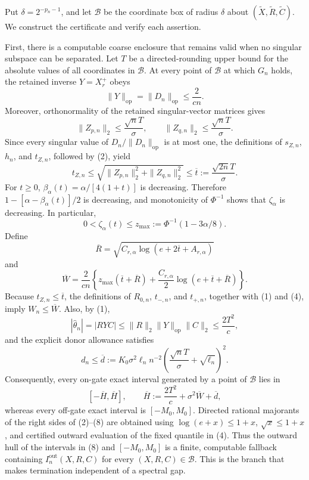 Put \(\delta=2^{-p_n-1}\), and let \(\mathcal B\) be the coordinate box of radius \(\delta\) about \((\widetilde X,\widetilde R,\widetilde C)\). We construct the certificate and verify each assertion.

First, there is a computable coarse enclosure that remains valid when no singular subspace can be separated. Let \(T\) be a directed-rounding upper bound for the absolute values of all coordinates in \(\mathcal B\). At every point of \(\mathcal B\) at which \(G_n\) holds, the retained inverse \(Y=X_r^+\) obeys
\[
\|Y\|_{\mathrm{op}}=\|D_n\|_{\mathrm{op}}\le \frac{2}{cn}.
\tag{1}
\]
Moreover, orthonormality of the retained singular-vector matrices gives
\[
\|Z_{p,n}\|_2\le \frac{\sqrt nT}{\sigma},
\qquad
\|Z_{q,n}\|_2\le \frac{\sqrt nT}{\sigma}.
\tag{2}
\]
Since every singular value of \(D_n/\|D_n\|_{\mathrm{op}}\) is at most one, the definitions of \(s_{Z,n}\), \(h_n\), and \(t_{Z,n}\), followed by (2), yield
\[
t_{Z,n}\le
\sqrt{\|Z_{p,n}\|_2^2+\|Z_{q,n}\|_2^2}
\le \overline t:=\frac{\sqrt{2n}T}{\sigma}.
\tag{3}
\]
For \(t\ge0\), \(\beta_\alpha(t)=\alpha/[4(1+t)]\) is decreasing. Therefore \(1-[\alpha-\beta_\alpha(t)]/2\) is decreasing, and monotonicity of \(\Phi^{-1}\) shows that \(\zeta_\alpha\) is decreasing. In particular,
\[
0<\zeta_\alpha(t)\le z_{\max}:=\Phi^{-1}(1-3\alpha/8).
\tag{4}
\]
Define
\[
\overline R=
\sqrt{C_{r,\alpha}\log(e+2\overline t+A_{r,\alpha})}
\]
and
\[
\overline W=\frac{2}{cn}
\left\{
z_{\max}(\overline t+\overline R)
+\frac{C_{r,\alpha}}2\log(e+\overline t+\overline R)
\right\}.
\tag{5}
\]
Because \(t_{Z,n}\le\overline t\), the definitions of \(R_{0,n}\), \(t_{-,n}\), and \(t_{+,n}\), together with (1) and (4), imply \(W_n\le\overline W\). Also, by (1),
\[
|\widehat\theta_n|=|RYC|
\le \|R\|_2\|Y\|_{\mathrm{op}}\|C\|_2
\le \frac{2T^2}{c},
\tag{6}
\]
and the explicit donor allowance satisfies
\[
d_n\le \overline d:=K_0\sigma^2\ell_n n^{-2}
\left(\frac{\sqrt nT}{\sigma}+\sqrt{\ell_n}\right)^2.
\tag{7}
\]
Consequently, every on-gate exact interval generated by a point of \(\mathcal B\) lies in
\[
[-\overline H,\overline H],
\qquad
\overline H:=\frac{2T^2}{c}+\sigma^2\overline W+\overline d,
\tag{8}
\]
whereas every off-gate exact interval is \([-M_0,M_0]\). Directed rational majorants of the right sides of (2)--(8) are obtained using \(\log(e+x)\le 1+x\), \(\sqrt{x}\le1+x\), and certified outward evaluation of the fixed quantile in (4). Thus the outward hull of the intervals in (8) and \([-M_0,M_0]\) is a finite, computable fallback containing \(I_n^{\mathrm{out}}(X,R,C)\) for every \((X,R,C)\in\mathcal B\). This is the branch that makes termination independent of a spectral gap.

